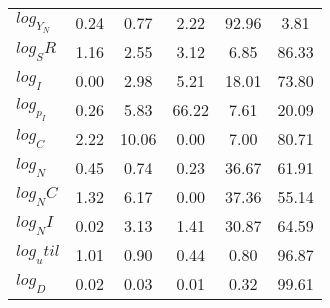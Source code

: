 \begin{center}
\begin{longtable}{lccccc}
$log_Y_N   $	 & 	        0.24	 & 	        0.77	 & 	        2.22	 & 	       92.96	 & 	        3.81 \\ 
$log_SR    $	 & 	        1.16	 & 	        2.55	 & 	        3.12	 & 	        6.85	 & 	       86.33 \\ 
$log_I     $	 & 	        0.00	 & 	        2.98	 & 	        5.21	 & 	       18.01	 & 	       73.80 \\ 
$log_p_I   $	 & 	        0.26	 & 	        5.83	 & 	       66.22	 & 	        7.61	 & 	       20.09 \\ 
$log_C     $	 & 	        2.22	 & 	       10.06	 & 	        0.00	 & 	        7.00	 & 	       80.71 \\ 
$log_N     $	 & 	        0.45	 & 	        0.74	 & 	        0.23	 & 	       36.67	 & 	       61.91 \\ 
$log_NC    $	 & 	        1.32	 & 	        6.17	 & 	        0.00	 & 	       37.36	 & 	       55.14 \\ 
$log_NI    $	 & 	        0.02	 & 	        3.13	 & 	        1.41	 & 	       30.87	 & 	       64.59 \\ 
$log_util  $	 & 	        1.01	 & 	        0.90	 & 	        0.44	 & 	        0.80	 & 	       96.87 \\ 
$log_D     $	 & 	        0.02	 & 	        0.03	 & 	        0.01	 & 	        0.32	 & 	       99.61 \\ 
\end{longtable}
 \end{center}
